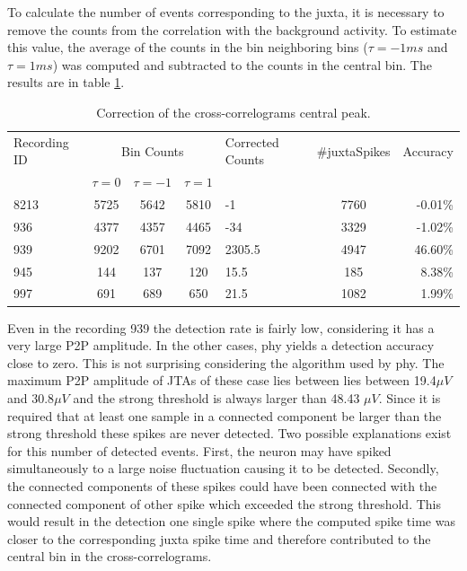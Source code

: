 \documentclass[10pt]{article}
\begin{document}
To calculate the number of events corresponding to the juxta, it is necessary to remove the counts from the correlation with the background activity. To estimate this value, the average of the counts in the bin neighboring bins ($\tau = -1ms$ and $\tau = 1 ms$) was computed and subtracted to the counts in the central bin. The results are in table \ref{tab:CCcorrection}.

\begin{table}[!h]
\begin{center}
\begin{tabular}{p{1.5cm}|c|c|c|p{1.3cm}|c|r}

\multicolumn{ 1}{p{1.5cm}|}{Recording ID} & \multicolumn{ 3}{c|}{Bin Counts} &  \multicolumn{ 1}{p{1.3cm}|}{Corrected Counts} & \multicolumn{ 1}{c|}{\#juxtaSpikes} & \multicolumn{ 1}{c}{Accuracy} \\ 
\multicolumn{ 1}{c|}{} & $\tau=0$ & $\tau=-1$ & $\tau=1$ & \multicolumn{ 1}{c|}{} & \multicolumn{ 1}{p{1.3cm}|}{} & \multicolumn{ 1}{l}{} \\ \hline
8213 & 5725 & 5642 & 5810 & -1 & 7760 & -0.01\% \\ 
936 & 4377 & 4357 & 4465 & -34 & 3329 & -1.02\% \\ 
939 & 9202 & 6701 & 7092 & 2305.5 & 4947 & 46.60\% \\ 
945 & 144 & 137 & 120 & 15.5 & 185 & 8.38\% \\ 
997 & 691 & 689 & 650 & 21.5 & 1082 & 1.99\% \\ 
\end{tabular}
\end{center}
\caption{Correction of the cross-correlograms central peak.}
\label{tab:CCcorrection}
\end{table}

Even in the recording 939 the detection rate is fairly low, considering it has a very large P2P amplitude.
In the other cases, phy yields a detection accuracy close to zero. This is not surprising considering the algorithm used by phy. The maximum P2P amplitude of JTAs of these case lies between lies between 19.4$\mu V$ and 30.8$\mu V$ and the strong threshold is always larger than 48.43 $\mu V$. Since it is required that at least one sample in a connected component be larger than the strong threshold these spikes are never detected. Two possible explanations exist for this number of detected events. First, the neuron may have spiked simultaneously to a large noise fluctuation causing it to be detected. Secondly, the connected components of these spikes could have been connected with the connected component of other spike which exceeded the strong threshold. This would result in the detection one single spike where the computed spike time was closer to the corresponding juxta spike time and therefore contributed to the central bin in the cross-correlograms.
\end{document}
